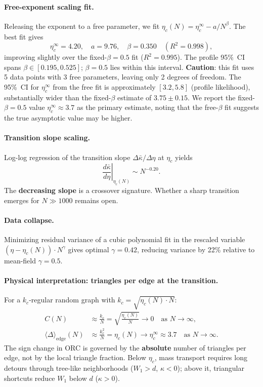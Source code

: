 \documentclass[12pt]{article}
\newcommand{\kbar}{\bar{\kappa}}
\newcommand{\etac}{\eta_c}
\begin{document}
\paragraph{Free-exponent scaling fit.} Releasing the exponent to a free parameter, we fit
$\etac(N) = \etac^\infty - a/N^\beta$. The best fit gives
\begin{equation}
  \etac^\infty = 4.20,\quad a = 9.76,\quad \beta = 0.350 \quad (R^2 = 0.998),
  \label{eq:freefit}
\end{equation}
improving slightly over the fixed-$\beta = 0.5$ fit ($R^2 = 0.995$). The profile 95\%~CI
spans $\beta \in [0.195, 0.525]$; $\beta = 0.5$ lies within this interval.
\textbf{Caution}: this fit uses 5 data points with 3 free parameters, leaving only 2
degrees of freedom. The 95\%~CI for $\etac^\infty$ from the free fit is approximately
$[3.2, 5.8]$ (profile likelihood), substantially wider than the fixed-$\beta$ estimate of
$3.75 \pm 0.15$. We report the fixed-$\beta = 0.5$ value $\etac^\infty \approx 3.7$ as the
primary estimate, noting that the free-$\beta$ fit suggests the true asymptotic value may
be higher.

\paragraph{Transition slope scaling.} Log-log regression of the transition slope
$\Delta\kbar/\Delta\eta$ at $\etac$ yields
\begin{equation}
  \left.\frac{d\kbar}{d\eta}\right|_{\etac(N)} \sim N^{-0.20}.
  \label{eq:slope}
\end{equation}
The \textbf{decreasing slope} is a crossover signature. Whether a sharp transition emerges
for $N \gg 1000$ remains open.

\paragraph{Data collapse.} Minimizing residual variance of a cubic polynomial fit in the
rescaled variable $(\eta - \etac(N))\cdot N^\gamma$ gives optimal $\gamma = 0.42$,
reducing variance by 22\% relative to mean-field $\gamma = 0.5$.

\paragraph{Physical interpretation: triangles per edge at the transition.} For a
$k_c$-regular random graph with $k_c = \sqrt{\etac(N)\cdot N}$:
\begin{align}
  C(N) &\approx \frac{k_c}{N} = \sqrt{\frac{\etac(N)}{N}} \to 0 \quad \text{as } N\to\infty,
  \label{eq:clustering}\\
  \langle\Delta\rangle_{\mathrm{edge}}(N) &\approx \frac{k_c^2}{N} = \etac(N)
  \to \etac^\infty \approx 3.7 \quad \text{as } N\to\infty.
  \label{eq:triangles}
\end{align}
The sign change in ORC is governed by the \textbf{absolute} number of triangles per edge,
not by the local triangle fraction. Below $\etac$, mass transport requires long detours
through tree-like neighborhoods ($W_1 > d$, $\kappa < 0$); above it, triangular shortcuts
reduce $W_1$ below $d$ ($\kappa > 0$).
\end{document}
